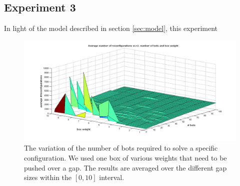 \subsection{Experiment 3}
\label{ssec:exp3}

In light of the model described in section \ref{sec:model}, this experiment 

\begin{figure}[H]
\centerline{\includegraphics[scale=0.45]{images/bots_vs_weight}}
\caption{The variation of the number of bots required to solve a specific configuration. We used one box of various weights that need to be pushed over a gap. The results are averaged over the different gap sizes within the $[0, 10]$ interval.}
\label{fig:botsvsweight}
\end{figure}
